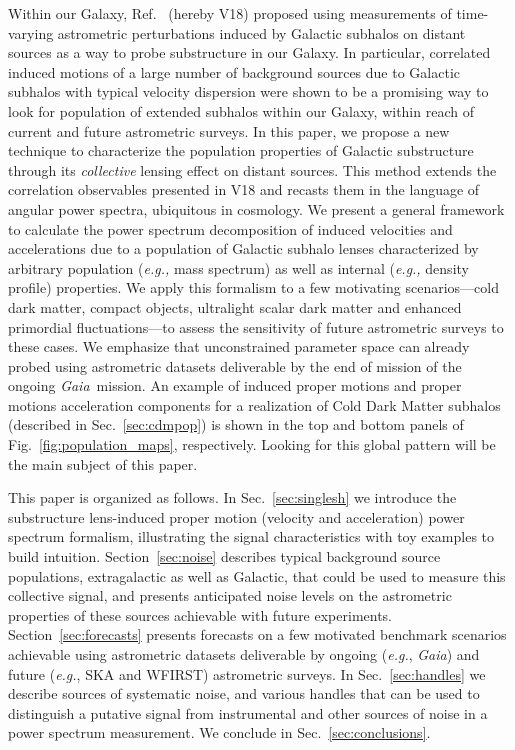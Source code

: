 \documentclass[prd,aps,10pt,nofootinbib,twocolumn,superscriptaddress,preprintnumbers,balancelastpage,longbibliography]{revtex4-1}
\newcommand{\Gaia}{\emph{Gaia}}
\begin{document}
Within our Galaxy, Ref.~\cite{VanTilburg:2018ykj} (hereby V18) proposed using measurements of time-varying astrometric perturbations induced by Galactic subhalos on distant sources as a way to probe substructure in our Galaxy. In particular, correlated induced motions of a large number of background sources due to Galactic subhalos with typical velocity dispersion were shown to be a promising way to look for population of extended subhalos within our Galaxy, within reach of current and future astrometric surveys. In this paper, we propose a new technique to characterize the population properties of Galactic substructure through its \emph{collective} lensing effect on distant sources. This method extends the correlation observables presented in V18 and recasts them in the language of angular power spectra, ubiquitous in cosmology. We present a general framework to calculate the power spectrum decomposition of induced velocities and accelerations due to a population of Galactic subhalo lenses characterized by arbitrary population (\emph{e.g.,} mass spectrum) as well as internal (\emph{e.g.,} density profile) properties. We apply this formalism to a few motivating scenarios---cold dark matter, compact objects, ultralight scalar dark matter and enhanced primordial fluctuations---to assess the sensitivity of future astrometric surveys to these cases. We emphasize that unconstrained parameter space can already probed using astrometric datasets deliverable by the end of mission of the ongoing \Gaia~mission. An example of induced proper motions and proper motions acceleration components for a realization of Cold Dark Matter subhalos (described in Sec.~\ref{sec:cdmpop}) is shown in the top and bottom panels of Fig.~\ref{fig:population_maps}, respectively. Looking for this global pattern will be the main subject of this paper.  

This paper is organized as follows. In Sec.~\ref{sec:singlesh} we introduce the substructure lens-induced proper motion (velocity and acceleration) power spectrum formalism, illustrating the signal characteristics with toy examples to build intuition. Section~\ref{sec:noise} describes typical background source populations, extragalactic as well as Galactic, that could be used to measure this collective signal, and presents anticipated noise levels on the astrometric properties of these sources achievable with future experiments.  Section~\ref{sec:forecasts} presents forecasts on a few motivated benchmark scenarios achievable using astrometric datasets deliverable by ongoing (\emph{e.g.}, \Gaia) and future (\emph{e.g.}, SKA and WFIRST) astrometric surveys. In Sec.~\ref{sec:handles} we describe sources of systematic noise, and various handles that can be used to distinguish a putative signal from instrumental and other sources of noise in a power spectrum measurement. 
We conclude in Sec.~\ref{sec:conclusions}.
\end{document}
